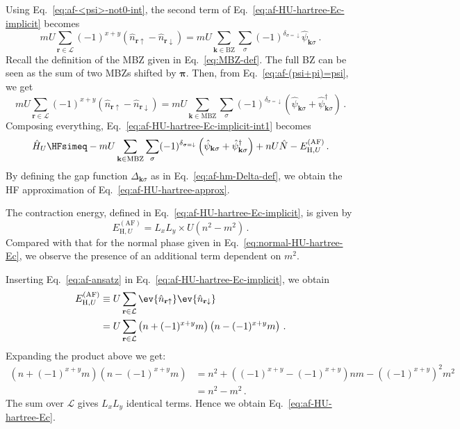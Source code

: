 \begin{tabproof}
	Using Eq.~\eqref{eq:af-<psi>-not0-int}, the second term of Eq.~\eqref{eq:af-HU-hartree-Ec-implicit} becomes
	\[
	mU \sum_{\mathbf{r}\in\mathcal{L}} (-1)^{x+y} \left(
	\hat n_{\mathbf{r}\uparrow} - \hat n_{\mathbf{r}\downarrow}
	\right) = mU \sum_{\mathbf{k} \in \mathrm{BZ}} \sum_\sigma (-1)^{\delta_{\sigma=\downarrow}} \hat \psi_{\mathbf{k}\sigma} \ .
	\]
	Recall the definition of the MBZ given in Eq.~\eqref{eq:MBZ-def}. The full BZ can be seen as the sum of two MBZs shifted by $\bm{\pi}$. Then, from Eq.~\eqref{eq:af-(psi+pi)=psi}, we get
	\[
	mU \sum_{\mathbf{r}\in\mathcal{L}} (-1)^{x+y} \left(
	\hat n_{\mathbf{r}\uparrow} - \hat n_{\mathbf{r}\downarrow}
	\right) = mU \sum_{\mathbf{k} \in \mathrm{MBZ}} \sum_\sigma (-1)^{\delta_{\sigma=\downarrow}} \left(
	\hat \psi_{\mathbf{k}\sigma} + \hat \psi_{\mathbf{k}\sigma}^\dagger
	\right) \, .
	\]
	Composing everything, Eq.~\eqref{eq:af-HU-hartree-Ec-implicit-int1} becomes
	\[
	\hat H_U \HFsimeq - mU \sum_{\mathbf{k}\in\mathrm{MBZ}} \sum_\sigma (-1)^{\delta_{\sigma=\downarrow}} \left(
	\hat \psi_{\mathbf{k}\sigma} + \hat \psi_{\mathbf{k}\sigma}^\dagger
	\right) + nU \hat N - E_{\mathrm{H},U}^{(\mathrm{AF})} \, .
	\]
	By defining the gap function $\Delta_{\mathbf{k}\sigma}$ as in Eq.~\eqref{eq:af-hm-Delta-def}, we obtain the HF approximation of Eq.~\eqref{eq:af-HU-hartree-approx}.
	
\end{tabproof}

The contraction energy, defined in Eq.~\eqref{eq:af-HU-hartree-Ec-implicit}, is given by
\begin{equation}\label{eq:af-HU-hartree-Ec}
	E_{\mathrm{H},U}^{(\mathrm{AF})} = L_x L_y \times U \left(
	n^2 - m^2
	\right) \, .
\end{equation}
Compared with that for the normal phase given in Eq.~\eqref{eq:normal-HU-hartree-Ec}, we observe the presence of an additional term dependent on $m^2$.

\begin{tabproof}
	
	Inserting Eq.~\eqref{eq:af-ansatz} in Eq.~\eqref{eq:af-HU-hartree-Ec-implicit}, we obtain
	\[
	\begin{aligned}
		E_{\mathrm{H},U}^{(\mathrm{AF})} &\equiv U \sum_{\mathbf{r}\in\mathcal{L}} \ev{\hat n_{\mathbf{r}\uparrow}} \ev{\hat n_{\mathbf{r}\downarrow}} \\
		&= U \sum_{\mathbf{r}\in\mathcal{L}} \left(
		n + (-1)^{x+y} m
		\right) \left(
		n - (-1)^{x+y} m
		\right) \, .
	\end{aligned}
	\]
	Expanding the product above we get:
	\[
	\begin{aligned}
		\left(
		n + (-1)^{x+y} m
		\right) \left(
		n - (-1)^{x+y} m
		\right) &= n^2 + \left(
		(-1)^{x+y} - (-1)^{x+y}
		\right)nm - \left((-1)^{x+y}\right)^2 m^2 \\
		&= n^2 - m^2 \, .
	\end{aligned}
	\]
	The sum over $\mathcal{L}$ gives $L_x L_y$ identical terms. Hence we obtain Eq.~\eqref{eq:af-HU-hartree-Ec}.
\end{tabproof}

